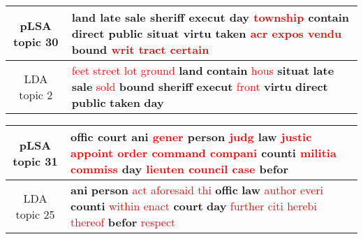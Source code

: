 \begin{center}\begin{tabularx}{\textwidth} {
  | c | >{\raggedright\arraybackslash}X | } \hline 
pLSA topic 30 & \textbf{land} \textbf{late} \textbf{sale} \textbf{sheriff} \textbf{execut} \textbf{day} \textcolor{red}{township} \textbf{contain} \textbf{direct} \textbf{public} \textbf{situat} \textbf{virtu} \textbf{taken} \textcolor{red}{acr} \textcolor{red}{expos} \textcolor{red}{vendu} \textbf{bound} \textcolor{red}{writ} \textcolor{red}{tract} \textcolor{red}{certain} \\ \hline 
LDA topic 2 & \textcolor{red}{feet} \textcolor{red}{street} \textcolor{red}{lot} \textcolor{red}{ground} \textbf{land} \textbf{contain} \textcolor{red}{hous} \textbf{situat} \textbf{late} \textbf{sale} \textcolor{red}{sold} \textbf{bound} \textbf{sheriff} \textbf{execut} \textcolor{red}{front} \textbf{virtu} \textbf{direct} \textbf{public} \textbf{taken} \textbf{day} \\ \hline 
\end{tabularx}

\end{center}

\begin{center}\begin{tabularx}{\textwidth} {
  | c | >{\raggedright\arraybackslash}X | } \hline 
pLSA topic 31 & \textbf{offic} \textbf{court} \textbf{ani} \textcolor{red}{gener} \textbf{person} \textcolor{red}{judg} \textbf{law} \textcolor{red}{justic} \textcolor{red}{appoint} \textcolor{red}{order} \textcolor{red}{command} \textcolor{red}{compani} \textbf{counti} \textcolor{red}{militia} \textcolor{red}{commiss} \textbf{day} \textcolor{red}{lieuten} \textcolor{red}{council} \textcolor{red}{case} \textbf{befor} \\ \hline 
LDA topic 25 & \textbf{ani} \textbf{person} \textcolor{red}{act} \textcolor{red}{aforesaid} \textcolor{red}{thi} \textbf{offic} \textbf{law} \textcolor{red}{author} \textcolor{red}{everi} \textbf{counti} \textcolor{red}{within} \textcolor{red}{enact} \textbf{court} \textbf{day} \textcolor{red}{further} \textcolor{red}{citi} \textcolor{red}{herebi} \textcolor{red}{thereof} \textbf{befor} \textcolor{red}{respect} \\ \hline 
\end{tabularx}

\end{center}

